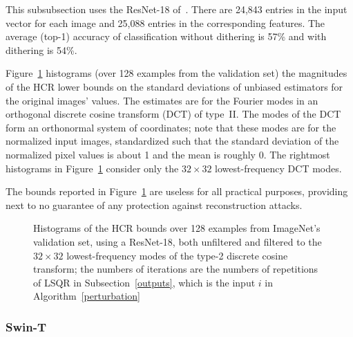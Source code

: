 \documentclass[]{fairmeta}
\begin{document}
This subsubsection uses the ResNet-18 of~\cite{he-zhang-ren-sun}.
There are 24,843 entries in the input vector for each image
and 25,088 entries in the corresponding features.
The average (top-1) accuracy of classification without dithering is 57\%
and with dithering is 54\%.

Figure~\ref{resnet18h} histograms (over 128 examples from the validation set)
the magnitudes of the HCR lower bounds on the standard deviations
of unbiased estimators for the original images' values.
The estimates are for the Fourier modes in an orthogonal
discrete cosine transform (DCT) of type~II.
The modes of the DCT form an orthonormal system of coordinates;
note that these modes are for the normalized input images,
standardized such that the standard deviation of the normalized pixel values
is about 1 and the mean is roughly 0.
The rightmost histograms in Figure~\ref{resnet18h}
consider only the $32 \times 32$ lowest-frequency DCT modes.

The bounds reported in Figure~\ref{resnet18h} are useless
for all practical purposes, providing next to no guarantee of any protection
against reconstruction attacks.

\begin{figure}
\begin{center}

\end{center}
% 
\caption{Histograms of the HCR bounds over 128 examples
from ImageNet's validation set, using a ResNet-18,
both unfiltered and filtered to the $32 \times 32$ lowest-frequency modes
of the type-2 discrete cosine transform; the numbers of iterations
are the numbers of repetitions of LSQR in Subsection~\ref{outputs},
which is the input $i$ in Algorithm~\ref{perturbation}}
\label{resnet18h}
%
\end{figure}

\subsubsection{Swin-T}
\label{swin}
\end{document}
